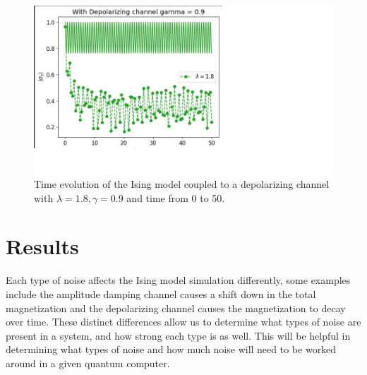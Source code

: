 \documentclass[12pt, twocolumn]{article}
\begin{document}
  \begin{figure}%
    \centering
    \includegraphics[width=\columnwidth, right]{images/LongRun.png}
    \caption{Time evolution of the Ising model coupled to a depolarizing channel with \( \lambda = 1.8, \gamma = 0.9\) and time from 0 to 50.%
      \label{fig:LongRun}}
  \end{figure}

  \section{Results}

  Each type of noise affects the Ising model simulation differently, some examples include the amplitude damping channel causes a shift down in the total magnetization and the depolarizing channel causes the magnetization to decay over time. These distinct differences allow us to determine what types of noise are present in a system, and how strong each type is as well. This will be helpful in determining what types of noise and how much noise will need to be worked around in a given quantum computer.

  \printbibliography
\end{document}

